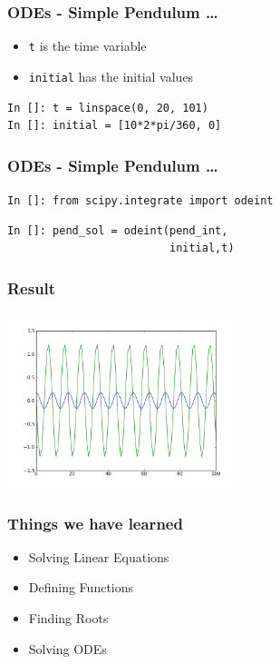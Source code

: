 \documentclass[14pt,compress]{beamer}
\newcounter{time}
\newcommand{\typ}[1]{\lstinline{#1}}
\begin{document}
\begin{frame}[fragile]
\frametitle{ODEs - Simple Pendulum \ldots}
\begin{itemize}
\item \typ{t} is the time variable \\ 
\item \typ{initial} has the initial values
\end{itemize}
\begin{lstlisting}
In []: t = linspace(0, 20, 101)
In []: initial = [10*2*pi/360, 0]
\end{lstlisting} 
\end{frame}

\begin{frame}[fragile]
\frametitle{ODEs - Simple Pendulum \ldots}
\typ{In []: from scipy.integrate import odeint}
\begin{lstlisting}
In []: pend_sol = odeint(pend_int, 
                         initial,t)
\end{lstlisting}
\end{frame}

\begin{frame}[fragile]
\frametitle{Result}
\begin{center}
\includegraphics[height=2in, interpolate=true]{data/ode}  
\end{center}
\end{frame}

\begin{frame}
  \frametitle{Things we have learned}
  \begin{itemize}
  \item Solving Linear Equations
  \item Defining Functions
  \item Finding Roots
  \item Solving ODEs
  \end{itemize}
\end{frame}
\end{document}
